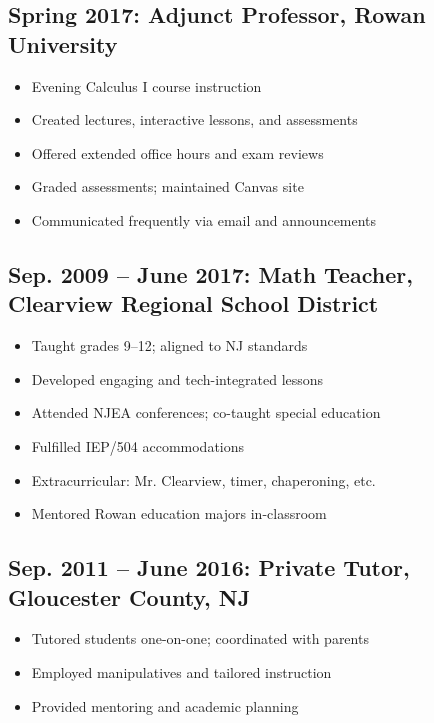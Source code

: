 \documentclass[11pt]{article}
\begin{document}
\subsection*{Spring 2017: Adjunct Professor, Rowan University}
\begin{itemize}
    \item Evening Calculus I course instruction
    \item Created lectures, interactive lessons, and assessments
    \item Offered extended office hours and exam reviews
    \item Graded assessments; maintained Canvas site
    \item Communicated frequently via email and announcements
\end{itemize}

\subsection*{Sep. 2009 -- June 2017: Math Teacher, Clearview Regional School District}
\begin{itemize}
    \item Taught grades 9--12; aligned to NJ standards
    \item Developed engaging and tech-integrated lessons
    \item Attended NJEA conferences; co-taught special education
    \item Fulfilled IEP/504 accommodations
    \item Extracurricular: Mr. Clearview, timer, chaperoning, etc.
    \item Mentored Rowan education majors in-classroom
\end{itemize}

\subsection*{Sep. 2011 -- June 2016: Private Tutor, Gloucester County, NJ}
\begin{itemize}
    \item Tutored students one-on-one; coordinated with parents
    \item Employed manipulatives and tailored instruction
    \item Provided mentoring and academic planning
\end{itemize}

\end{document}
